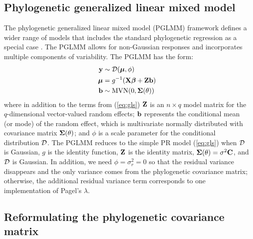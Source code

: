 \documentclass[12pt]{article}
\begin{document}
\subsection*{Phylogenetic generalized linear mixed model}

The phylogenetic generalized linear mixed model (PGLMM) framework defines a wider range of models that includes the standard phylogenetic regression as a special case \citep{lynch1991methods}.
The PGLMM allows for non-Gaussian responses and incorporates multiple components of variability.
The PGLMM has the form:
\newcommand{\dist}{{\cal D}}
\begin{equation}
\begin{aligned}
\bY & \sim \dist(\bmu, \phi) \\
\bmu & = g^{-1}(\bX \bbeta + \bZ \bb)  \\
\bb & \sim \textrm{MVN}(0, \bSigma(\theta))  \\
\label{eq:glmm}
\end{aligned}
\end{equation}
where in addition to the terms from (\ref{eq:gls}) ${\mathbf Z}$ is an $n \times q$ model matrix for the $q$-dimensional vector-valued random effects; ${\mathbf b}$ represents the conditional mean (or mode) of the random effect, which is multivariate normally distributed with covariance matrix ${\boldsymbol \Sigma}(\theta)$; and $\phi$ is a scale parameter for the conditional distribution $\dist$.
The PGLMM reduces to the simple PR model (\ref{eq:gls}) when
$\dist$ is Gaussian, $g$ is the identity function, ${\mathbf Z}$ is the identity matrix,
${\boldsymbol \Sigma}(\theta)=\sigma^2{\mathbf C}$, and $\dist$ is Gaussian. In addition, we need $\phi=\sigma_r^2 = 0$ so that the residual variance disappears and the only variance comes from the phylogenetic covariance matrix; otherwise, the additional residual variance term corresponds to one implementation of Pagel's $\lambda$.

\subsection*{Reformulating the phylogenetic covariance matrix}

\newcommand{\bS}{{\mathbf S}}
\newcommand{\bJ}{{\mathbf J}}
\newcommand{\bB}{{\mathbf B}}
\newcommand{\bBadj}{{\mathbf B}_{\mbox{\tiny adj}}}
\newcommand{\bomega}{{\boldsymbol \omega}}
\newcommand{\bell}{{\boldsymbol \ell}}
\newcommand{\e}{{ \epsilon}}
\end{document}
